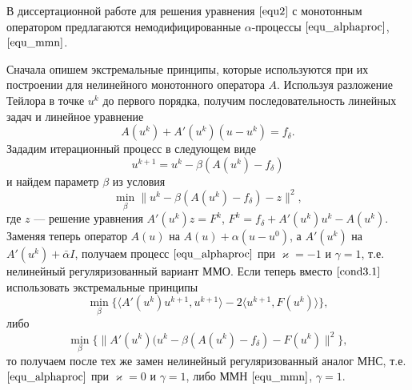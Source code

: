 В диссертационной работе для решения уравнения $\eqref{equ2}$ с монотонным оператором предлагаются немодифицированные $\alpha$-процессы $\eqref{equ_alphaproc}$, $\eqref{equ_mmn}$.

Сначала опишем экстремальные принципы, которые используются при их  построении для нелинейного монотонного оператора $A$. Используя разложение Тейлора в точке $u^k$ до первого порядка, получим последовательность линейных задач и линейное уравнение
\begin{equation*}
A(u^k)+A'(u^k)(u-u^k)=f_{\delta}.
\end{equation*}
Зададим итерационный процесс в следующем виде
\begin{equation*}
u^{k+1}=u^k-\beta(A(u^k)-f_{\delta})
\end{equation*}
и найдем параметр $\beta$ из условия
\begin{equation}\label{cond3.1}
\min_{\beta}{\|u^k-\beta(A(u^k)-f_{\delta})-z\|^2},
\end{equation}
где $z$ --- решение уравнения $A'(u^k)z=F^k$, $F^k=f_{\delta}+A'(u^k)u^k-A(u^k)$. Заменяя теперь оператор $A(u)$ на $A(u)+\alpha(u-u^0)$, а $A'(u^k)$ на $A'(u^k)+\bar\alpha I$, получаем процесс $\eqref{equ_alphaproc}$ при $\varkappa=-1$ и $\gamma=1$, т.е. нелинейный регуляризованный вариант ММО. Если теперь вместо $\eqref{cond3.1}$ использовать экстремальные принципы
$$\min_{\beta}\{\langle A'(u^k)u^{k+1},u^{k+1}\rangle-2\langle u^{k+1},F(u^k)\rangle\},$$
либо 
\begin{equation}\label{cond3.2}
\min_{\beta}\{\|A'(u^k)(u^k-\beta(A(u^k)-f_{\delta})-F(u^k)\|^2\},
\end{equation}
то получаем после тех же замен нелинейный регуляризованный аналог МНС, т.е. $\eqref{equ_alphaproc}$ при $\varkappa=0$ и $\gamma=1$, либо ММН $\eqref{equ_mmn}$, $\gamma=1$.


